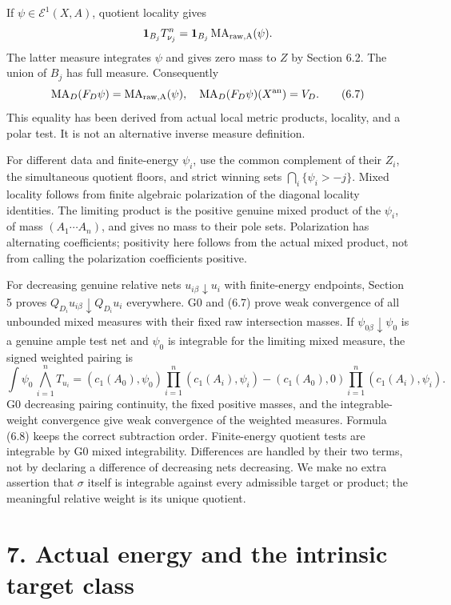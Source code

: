 \documentclass[
  10pt,
]{article}
\begin{document}
If \(\psi\in\mathcal E^1(X,A)\), quotient locality gives
\[\mathbf1_{B_j}T_{\nu_j}^n
 =\mathbf1_{B_j}\operatorname{MA}_{\rm raw,A}(\psi).\] The latter
measure integrates \(\psi\) and gives zero mass to \(Z\) by Section 6.2.
The union of \(B_j\) has full measure. Consequently
\[\operatorname{MA}_D(F_D\psi)=\operatorname{MA}_{\rm raw,A}(\psi),\quad
\operatorname{MA}_D(F_D\psi)(X^{\rm an})=V_D.\tag{6.7}\] This equality
has been derived from actual local metric products, locality, and a
polar test. It is not an alternative inverse measure definition.

For different data and finite-energy \(\psi_i\), use the common
complement of their \(Z_i\), the simultaneous quotient floors, and
strict winning sets \(\bigcap_i\{\psi_i>-j\}\). Mixed locality follows
from finite algebraic polarization of the diagonal locality identities.
The limiting product is the positive genuine mixed product of the
\(\psi_i\), of mass \((A_1\cdots A_n)\), and gives no mass to their pole
sets. Polarization has alternating coefficients; positivity here follows
from the actual mixed product, not from calling the polarization
coefficients positive.

For decreasing genuine relative nets \(u_{i\beta}\downarrow u_i\) with
finite-energy endpoints, Section 5 proves
\(Q_{D_i}u_{i\beta}\downarrow Q_{D_i}u_i\) everywhere. G0 and (6.7)
prove weak convergence of all unbounded mixed measures with their fixed
raw intersection masses. If \(\psi_{0\beta}\downarrow\psi_0\) is a
genuine ample test net and \(\psi_0\) is integrable for the limiting
mixed measure, the signed weighted pairing is
\[\int\psi_0\,\bigwedge_{i=1}^nT_{u_i}
=(c_1(A_0),\psi_0)\prod_{i=1}^n(c_1(A_i),\psi_i)
 -(c_1(A_0),0)\prod_{i=1}^n(c_1(A_i),\psi_i).\tag{6.8}\] G0 decreasing
pairing continuity, the fixed positive masses, and the integrable-weight
convergence give weak convergence of the weighted measures. Formula
(6.8) keeps the correct subtraction order. Finite-energy quotient tests
are integrable by G0 mixed integrability. Differences are handled by
their two terms, not by declaring a difference of decreasing nets
decreasing. We make no extra assertion that \(\sigma\) itself is
integrable against every admissible target or product; the meaningful
relative weight is its unique quotient.

\section{7. Actual energy and the intrinsic target
class}\label{actual-energy-and-the-intrinsic-target-class}
\end{document}
